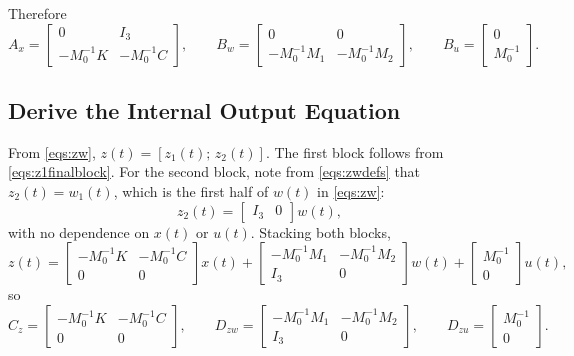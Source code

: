 \documentclass[11pt]{article}
\begin{document}
Therefore
\begin{equation}
    A_x =
    \begin{bmatrix}
        0 & I_3 \\
        -M_0^{-1}K & -M_0^{-1}C
    \end{bmatrix},
    \qquad
    B_w =
    \begin{bmatrix}
        0 & 0 \\
        -M_0^{-1}M_1 & -M_0^{-1}M_2
    \end{bmatrix},
    \qquad
    B_u =
    \begin{bmatrix}
        0 \\
        M_0^{-1}
    \end{bmatrix}.
    \label{eqs:ABmats}
\end{equation}

\subsection{Derive the Internal Output Equation}

From \eqref{eqs:zw}, $z(t) = [z_1(t);\, z_2(t)]$. The first block follows from
\eqref{eqs:z1finalblock}. For the second block, note from \eqref{eqs:zwdefs} that
$z_2(t) = w_1(t)$, which is the first half of $w(t)$ in \eqref{eqs:zw}:
\begin{equation}
    z_2(t) =
    \begin{bmatrix}
        I_3 & 0
    \end{bmatrix}
    w(t),
    \label{eqs:z2selector}
\end{equation}
with no dependence on $x(t)$ or $u(t)$. Stacking both blocks,
\begin{equation}
    z(t)
    =
    \begin{bmatrix}
        -M_0^{-1}K & -M_0^{-1}C \\
        0 & 0
    \end{bmatrix}
    x(t)
    +
    \begin{bmatrix}
        -M_0^{-1}M_1 & -M_0^{-1}M_2 \\
        I_3 & 0
    \end{bmatrix}
    w(t)
    +
    \begin{bmatrix}
        M_0^{-1} \\
        0
    \end{bmatrix}
    u(t),
    \label{eqs:loopblocks}
\end{equation}
so
\begin{equation}
    C_z =
    \begin{bmatrix}
        -M_0^{-1}K & -M_0^{-1}C \\
        0 & 0
    \end{bmatrix},
    \qquad
    D_{zw} =
    \begin{bmatrix}
        -M_0^{-1}M_1 & -M_0^{-1}M_2 \\
        I_3 & 0
    \end{bmatrix},
    \qquad
    D_{zu} =
    \begin{bmatrix}
        M_0^{-1} \\
        0
    \end{bmatrix}.
    \label{eqs:CDloop}
\end{equation}
\end{document}
